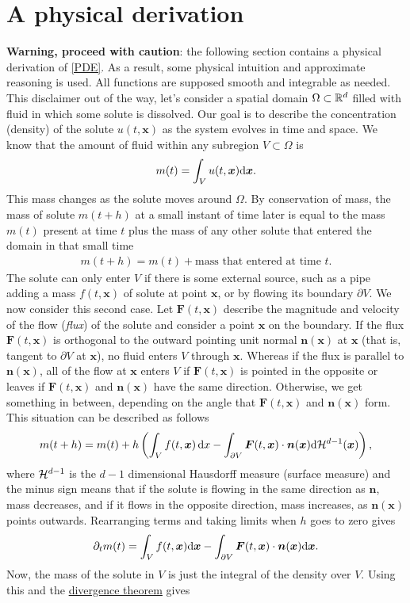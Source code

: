 \documentclass[
    a4paper,
    DIV=14,
    abstract=true,
    numbers=noenddot
]{scrartcl}
\begin{document}
\section{A physical derivation}
\textbf{Warning, proceed with caution}: the following section contains a physical derivation of  \eqref{PDE}. As a result, some physical intuition and approximate reasoning is used. All functions are supposed smooth and integrable as needed.
This disclaimer out of the way, let's consider a spatial domain $\Omega \subset \mathbb{R}^d$ filled with fluid in which some solute is dissolved. Our goal is to describe the concentration (density) of the solute $u(t,\bm{x}) $ as the system evolves in time and space. We know that the amount of fluid within any subregion $V \subset  \Omega$ is
\begin{align*}
	m(t)=\int_{V} u(t,\bm{x}) \mathrm{d} \bm{x}  .
\end{align*}
This mass changes as the solute moves around $\Omega$.	By conservation of mass, the mass of solute $m(t+h)$ at a small instant of time later is equal to the mass $m(t)$ present at time $t$ plus the mass of any other solute that entered the domain in that small time
\begin{align*}
	m(t+h)=m(t)+ \text{mass that entered at time } t .
\end{align*}
The solute can only enter $V$ if there is some external source, such as a pipe adding a mass $f(t,\bm{x})$ of solute at point $\bm{x}$, or by flowing its boundary  $\partial V$. We now consider this second case. Let $\bm{F}(t,\bm{x} ) $ describe the magnitude and velocity of the flow (\emph{flux}) of the solute and consider a point $\bm{x}$ on the boundary. If the flux $\bm{F}(t,\bm{x} )$ is orthogonal to the outward pointing unit normal $\bm{n}(\bm{x})$ at $\bm{x}$ (that is, tangent to $\partial  V$ at $\bm{x}$), no fluid enters $V$ through $\bm{x}$. Whereas if the flux is parallel to $\bm{n}(\bm{x})$, all of the flow at $\bm{x} $ enters $V$ if $\bm{F}(t,\bm{x})$ is pointed in the opposite or leaves if $\bm{F}(t,\bm{x})$ and $\bm{n}(\bm{x})$ have the same direction. Otherwise, we get something in between, depending on the angle that $\bm{F}(t,\bm{x})$ and $\bm{n}(\bm{x})$ form. This situation can be described as follows
\begin{align*}
	m(t+h)=m(t) +h \left( \int_{V} f(t,\bm{x} ) \,\mathrm{d}x- \int_{\partial V} \bm{F}(t, \bm{x})\cdot \bm{n}(\bm{x} )    \mathrm{d}  \mathcal{H}^{d-1}(\bm{x})  \right),
\end{align*}
where $\mathcal{H}^{d-1}$ is the $d-1$ dimensional Hausdorff measure (surface measure) and the minus sign means that if the solute is flowing in the same direction as $\bm{n}$, mass decreases, and if it flows in the opposite direction, mass increases, as $ \bm{n}(\bm{x})$ points outwards. Rearranging terms and taking limits when $h$ goes to zero gives
\begin{align*}
	\partial _t m(t)=\int_{V}f(t,\bm{x} ) \mathrm{d} \bm{x}   -\int_{\partial V}  \bm{F}(t, \bm{x})\cdot \bm{n}(\bm{x} )    \mathrm{d}  \bm{x}  .	\end{align*}
Now, the mass of the solute in $V$ is just the integral of the density over $V$. Using this and the \href{https://en.wikipedia.org/wiki/Divergence_theorem#:~:text=%5Bedit%5D-,For,-bounded%20open%20subsets}{divergence theorem} gives
\end{document}
